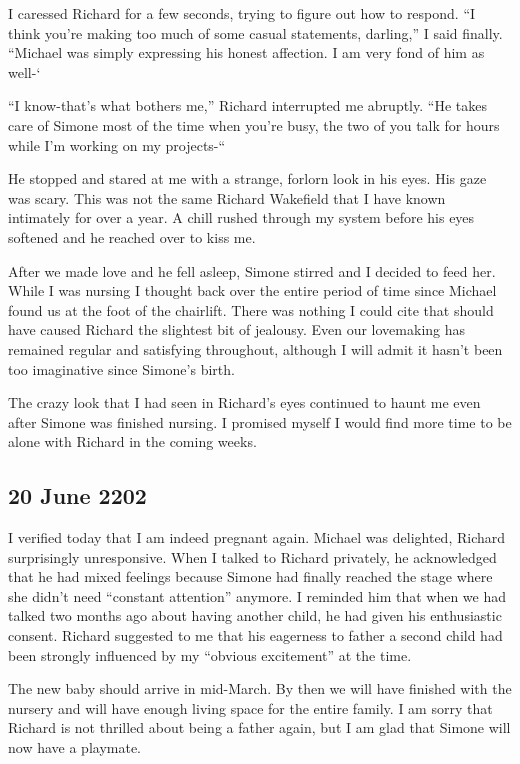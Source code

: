 \documentclass[]{article}
\begin{document}
I caressed Richard for a few seconds, trying to figure out how to respond.  “I think you’re making too much of some casual statements, darling,” I said finally.  “Michael was simply expressing his honest affection.  I am very fond of him as well-‘

“I know-that’s what bothers me,” Richard interrupted me abruptly.  “He takes care of Simone most of the time when you’re busy, the two of you talk for hours while I’m working on my projects-“

He stopped and stared at me with a strange, forlorn look in his eyes.  His gaze was scary.  This was not the same Richard Wakefield that I have known intimately for over a year.  A chill rushed through my system before his eyes softened and he reached over to kiss me.

After we made love and he fell asleep, Simone stirred and I decided to feed her.  While I was nursing I thought back over the entire period of time since Michael found us at the foot of the chairlift.  There was nothing I could cite that should have caused Richard the slightest bit of jealousy.  Even our lovemaking has remained regular and satisfying throughout, although I will admit it hasn’t been too imaginative since Simone’s birth.

The crazy look that I had seen in Richard’s eyes continued to haunt me even after Simone was finished nursing.  I promised myself I would find more time to be alone with Richard in the coming weeks.

\subsection*{20 June 2202}

I verified today that I am indeed pregnant again.  Michael was delighted, Richard surprisingly unresponsive.  When I talked to Richard privately, he acknowledged that he had mixed feelings because Simone had finally reached the stage where she didn’t need “constant attention” anymore.  I reminded him that when we had talked two months ago about having another child, he had given his enthusiastic consent.  Richard suggested to me that his eagerness to father a second child had been strongly influenced by my “obvious excitement” at the time.

The new baby should arrive in mid-March.  By then we will have finished with the nursery and will have enough living space for the entire family.  I am sorry that Richard is not thrilled about being a father again, but I am glad that Simone will now have a playmate.
\end{document}
